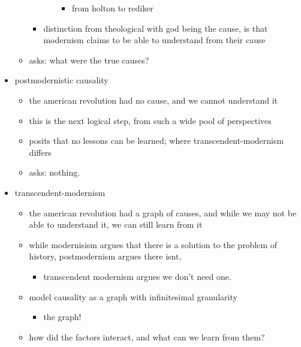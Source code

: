 \documentclass[letterpaper]{article}
\begin{document}
\begin{itemize}
\begin{itemize}
\begin{itemize}
\begin{itemize}
\begin{itemize}
\item from holton to rediker
\end{itemize}
\end{itemize}

\item distinction from theological with god being the cause, is that
modernism claims to be able to understand from their cause
\end{itemize}

\item asks: what were the true causes?
\end{itemize}

\item postmodernistic causality

\begin{itemize}
\item the american revolution had no cause, and we cannot understand it
\item this is the next logical step, from such a wide pool of perspectives
\item posits that no lessons can be learned; where transcendent-modernism
differs
\item asks: nothing.
\end{itemize}

\item transcendent-modernism

\begin{itemize}
\item the american revolution had a graph of causes, and while we may not
be able to understand it, we can still learn from it
\item while modernisism argues that there is a solution to the problem of
history, postmodernism argues there isnt,

\begin{itemize}
\item transcendent modernism argues we don't need one.
\end{itemize}

\item model causality as a graph with infinitesimal granularity

\begin{itemize}
\item the graph!
\end{itemize}

\item how did the factors interact, and what can we learn from them?
\end{itemize}


\end{itemize}
\end{document}
